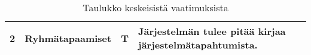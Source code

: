 \begin{landscape}
\begin{table}[]
{\begin{tabular}{llll}
    \multicolumn{1}{|l|}{2}                                            & \multicolumn{1}{l|}{Ryhmätapaamiset}                                      & \multicolumn{1}{l|}{T}                                    & \multicolumn{1}{l|}{Järjestelmän tulee pitää kirjaa järjestelmätapahtumista.}                               \\ \hline
   

    \end{tabular}
}
    \caption{Taulukko keskeisistä vaatimuksista}
    \label{tab:vaatimukset}
    \end{table}	
\end{landscape}
